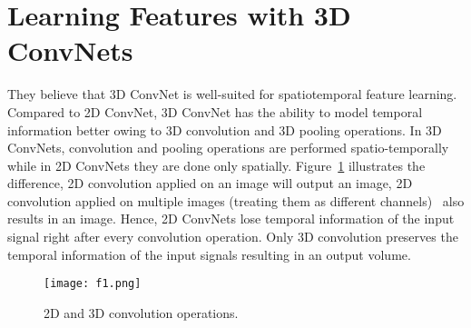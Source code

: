 \documentclass[10pt,twocolumn,letterpaper]{article}
\begin{document}
\section{Learning Features with 3D ConvNets}
They believe that 3D ConvNet is well-suited for spatiotemporal feature learning. Compared to 2D ConvNet, 3D ConvNet has the ability to model temporal information better owing to 3D convolution and 3D pooling operations. In 3D ConvNets, convolution and pooling operations are performed spatio-temporally while in 2D ConvNets they are done only spatially. Figure~\ref{Figure1} illustrates the difference, 2D convolution applied on an image will output an image, 2D convolution applied on multiple images (treating them as different channels)~\cite{name32} also results in an image. Hence, 2D ConvNets lose temporal information of the input signal right after every convolution operation. Only 3D convolution preserves the temporal information of the input signals resulting in an output volume.
  \begin{figure}[!htb]
  	\centering
  	\texttt{[image: f1.png]}\\
  	\caption{2D and 3D convolution operations.}\label{Figure1} 
  \end{figure}


\end{document}
